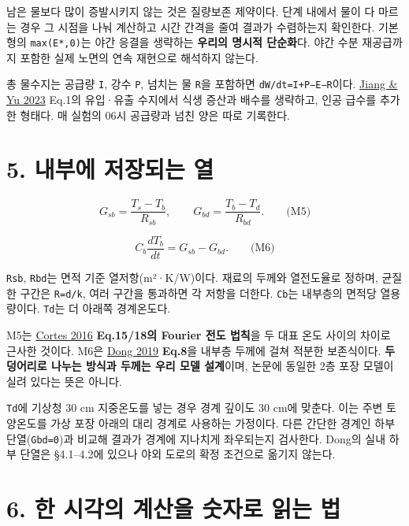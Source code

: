 \documentclass[11pt,a4paper]{article}
\begin{document}
남은 물보다 많이 증발시키지 않는 것은 질량보존 제약이다. 단계 내에서 물이 다 마르는 경우 그 시점을 나눠 계산하고 시간 간격을 줄여 결과가 수렴하는지 확인한다. 기본형의 \texttt{max(E*,0)}는 야간 응결을 생략하는 \textbf{우리의 명시적 단순화}다. 야간 수분 재공급까지 포함한 실제 노면의 연속 재현으로 해석하지 않는다.

총 물수지는 공급량 \texttt{I}, 강수 \texttt{P}, 넘치는 물 \texttt{R}을 포함하면 \texttt{dW/dt=I+P−E−R}이다. \href{\detokenize{https://link.springer.com/article/10.1186/s43065-023-00090-9}}{Jiang \& Yu 2023} Eq.1의 유입·유출 수지에서 식생 증산과 배수를 생략하고, 인공 급수를 추가한 형태다. 매 실험의 06시 공급량과 넘친 양은 따로 기록한다.

\section{5. 내부에 저장되는 열}

\begin{equation*}
G_{sb}=\frac{T_s-T_b}{R_{sb}},\qquad
G_{bd}=\frac{T_b-T_d}{R_{bd}}.\qquad\text{(M5)}
\end{equation*}

\begin{equation*}
C_b\frac{dT_b}{dt}=G_{sb}-G_{bd}.\qquad\text{(M6)}
\end{equation*}

\texttt{Rsb}, \texttt{Rbd}는 면적 기준 열저항(m²·K/W)이다. 재료의 두께와 열전도율로 정하며, 균질한 구간은 \texttt{R=d/k}, 여러 구간을 통과하면 각 저항을 더한다. \texttt{Cb}는 내부층의 면적당 열용량이다. \texttt{Td}는 더 아래쪽 경계온도다.

M5는 \href{\detokenize{https://www.jstage.jst.go.jp/article/taiki/51/2/51_103/_pdf/-char/en}}{Cortes 2016} \textbf{Eq.15/18의 Fourier 전도 법칙}을 두 대표 온도 사이의 차이로 근사한 것이다. M6은 \href{\detokenize{https://mdpi-res.com/d_attachment/materials/materials-12-02546/article_deploy/materials-12-02546.pdf}}{Dong 2019} \textbf{Eq.8}을 내부층 두께에 걸쳐 적분한 보존식이다. \textbf{두 덩어리로 나누는 방식과 두께는 우리 모델 설계}이며, 논문에 동일한 2층 포장 모델이 실려 있다는 뜻은 아니다.

\texttt{Td}에 기상청 30 cm 지중온도를 넣는 경우 경계 깊이도 30 cm에 맞춘다. 이는 주변 토양온도를 가상 포장 아래의 대리 경계로 사용하는 가정이다. 다른 간단한 경계인 하부 단열(\texttt{Gbd=0})과 비교해 결과가 경계에 지나치게 좌우되는지 검사한다. Dong의 실내 하부 단열은 §4.1–4.2에 있으나 야외 도로의 확정 조건으로 옮기지 않는다.

\section{6. 한 시각의 계산을 숫자로 읽는 법}
\end{document}
